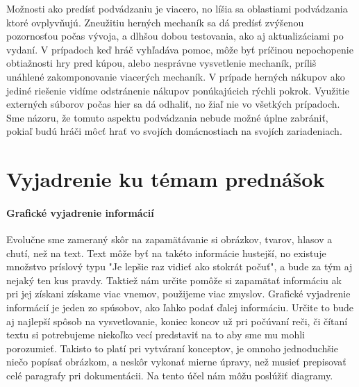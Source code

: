 \documentclass[10pt, oneside, slovak,a4paper]{article}
\begin{document}
Možnosti ako predísť podvádzaniu je viacero, no líšia sa oblastiami podvádzania ktoré ovplyvňujú. Zneužitiu herných mechaník sa dá predísť zvýšenou pozornosťou počas vývoja, a dlhšou dobou testovania, ako aj aktualizáciami po vydaní. V prípadoch keď hráč vyhľadáva pomoc, môže byť príčinou nepochopenie obtiažnosti hry pred kúpou, alebo nesprávne vysvetlenie mechaník, príliš unáhlené zakomponovanie viacerých mechaník. V prípade herných nákupov ako jediné riešenie vidíme odstránenie nákupov ponúkajúcich rýchli pokrok. Využitie externých súborov počas hier sa dá odhaliť, no žiaľ nie vo všetkých prípadoch. Sme názoru, že tomuto aspektu podvádzania nebude možné úplne zabrániť, pokiaľ budú hráči môcť hrať vo svojích domácnostiach na svojích zariadeniach.

\section*{Vyjadrenie ku témam prednášok}

\paragraph{Grafické vyjadrenie informácií}
Evolučne sme zameraný skôr na zapamätávanie si obrázkov, tvarov, hlasov a chutí, než na text. Text môže byť na takéto informácie hustejší, no existuje množstvo príslový typu "Je lepšie raz vidieť ako stokrát počuť", a bude za tým aj nejaký ten kus pravdy. Taktiež nám určite pomôže si zapamätať informáciu ak pri jej získani získame viac vnemov, použijeme viac zmyslov.
Grafické vyjadrenie informácií je jeden zo spúsobov, ako ľahko podať ďalej informáciu. Určite to bude aj najlepší spôsob na vysvetlovanie, koniec koncov už pri počúvaní reči, či čítaní textu si potrebujeme niekoľko vecí predstaviť na to aby sme mu mohli porozumieť. Takisto to platí pri vytváraní konceptov, je omnoho jednoduchšie niečo popísať obrázkom, a neskôr vykonať mierne úpravy, než musieť prepisovať celé paragrafy pri dokumentácii. Na tento účel nám môžu poslúžiť diagramy.
\end{document}
